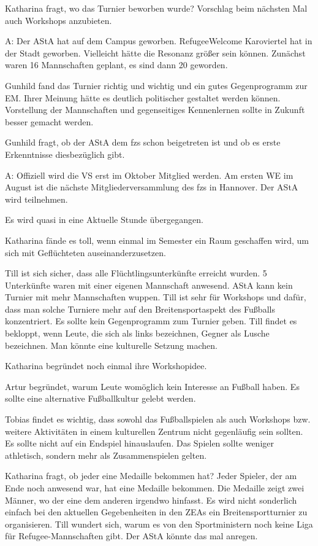 \documentclass[ngerman,headheight=70pt]{scrartcl}
\begin{document}
    Katharina fragt, wo das Turnier beworben wurde? Vorschlag beim nächsten Mal
    auch Workshops anzubieten.

    A: Der AStA hat auf dem Campus geworben. RefugeeWelcome Karoviertel hat in
    der Stadt geworben. Vielleicht hätte die Resonanz größer sein können. Zunächst
    waren 16 Mannschaften geplant, es sind dann 20 geworden.

    Gunhild fand das Turnier richtig und wichtig und ein gutes Gegenprogramm
    zur EM. Ihrer Meinung hätte es deutlich politischer gestaltet werden können.
    Vorstellung der Mannschaften und gegenseitiges Kennenlernen sollte in
    Zukunft besser gemacht werden.

    Gunhild fragt, ob der AStA dem fzs schon beigetreten ist und ob es erste
    Erkenntnisse diesbezüglich gibt.

    A: Offiziell wird die VS erst im Oktober Mitglied werden. Am ersten WE im August
    ist die nächste Mitgliederversammlung des fzs in Hannover. Der AStA wird teilnehmen.

    Es wird quasi in eine Aktuelle Stunde übergegangen.

    Katharina fände es toll, wenn einmal im Semester ein Raum geschaffen wird,
    um sich mit Geflüchteten auseinanderzusetzen.

    Till ist sich sicher, dass alle Flüchtlingsunterkünfte erreicht wurden.
    5 Unterkünfte waren mit einer eigenen Mannschaft anwesend. AStA kann kein
    Turnier mit mehr Mannschaften wuppen. Till ist sehr für Workshops und dafür,
    dass man solche Turniere mehr auf den Breitensportaspekt des Fußballs konzentriert.
    Es sollte kein Gegenprogramm zum Turnier geben.
    Till findet es bekloppt, wenn Leute, die sich als links bezeichnen,
    Gegner als Lusche bezeichnen. Man könnte eine kulturelle Setzung machen.

    Katharina begründet noch einmal ihre Workshopidee.

    Artur begründet, warum Leute womöglich kein Interesse an Fußball haben.
    Es sollte eine alternative Fußballkultur gelebt werden.

    Tobias findet es wichtig, dass sowohl das Fußballspielen als auch Workshops
    bzw. weitere Aktivitäten in einem kulturellen Zentrum nicht gegenläufig
    sein sollten. Es sollte nicht auf ein Endspiel hinauslaufen. Das Spielen
    sollte weniger athletisch, sondern mehr als Zusammenspielen gelten.

    Katharina fragt, ob jeder eine Medaille bekommen hat? Jeder Spieler,
    der am Ende noch anwesend war, hat eine Medaille bekommen. Die Medaille
    zeigt zwei Männer, wo der eine dem anderen irgendwo hinfasst. Es wird
    nicht sonderlich einfach bei den aktuellen Gegebenheiten in den
    ZEAs ein Breitensportturnier zu organisieren. Till wundert sich, warum
    es von den Sportministern noch keine Liga für Refugee-Mannschaften gibt.
    Der AStA könnte das mal anregen.
\end{document}
